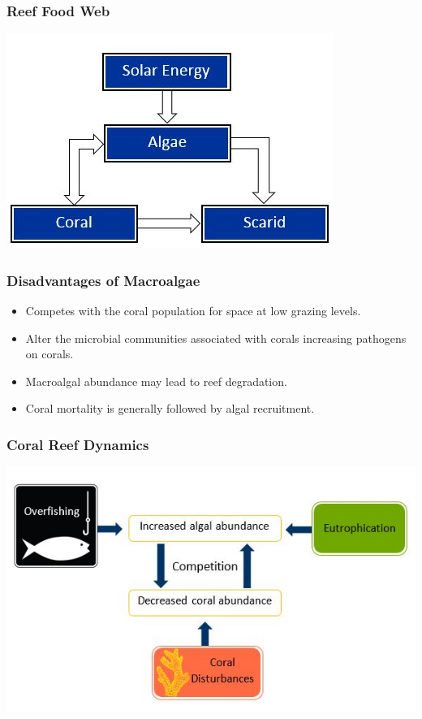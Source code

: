 \begin{frame}
\centering
\frametitle{Reef Food Web}
\includegraphics[scale=.65]{./CoralFoodWeb}
\end{frame}

\begin{frame}
\frametitle{Disadvantages of Macroalgae}
\begin{itemize}
\item Competes with the coral population for space at low grazing levels.
\item Alter the microbial communities associated with corals increasing pathogens on corals.
\item Macroalgal abundance may lead to reef degradation.
\item Coral mortality is generally followed by algal recruitment.
\end{itemize}
\end{frame}

\begin{frame}
\frametitle{Coral Reef Dynamics}
\includegraphics[scale=.7]{./CoralDynamics}
\end{frame}

